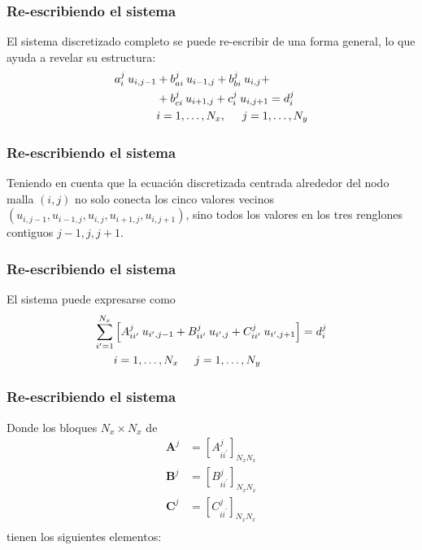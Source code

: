 \begin{frame}
\frametitle{Re-escribiendo el sistema}
El sistema discretizado completo se puede re-escribir de una forma general, lo que ayuda a revelar su estructura:
\begin{equation}
\begin{aligned}
a_{i}^{j} \: u_{i, j-1} &+ b_{ai}^{j} \: u_{i-1, j} + b_{bi}^{j} \: u_{i, j} + \\
&+ b_{ci}^{j} \: u_{i+1, j} + c_{i}^{j} \: u_{i, j+1} = d_{i}^{j} \\
&i = 1, \ldots, N_{x}, \hspace{0.5cm} j = 1, \ldots, N_{y}
\end{aligned}
\label{eq:ecuacion_13_14}
\end{equation}
\end{frame}
\begin{frame}
\frametitle{Re-escribiendo el sistema}
Teniendo en cuenta que la ecuación discretizada centrada alrededor del nodo malla $(i, j)$ no solo conecta los cinco valores vecinos $(u_{i, j-1}, u_{i-1, j}, u_{i,j}, u_{i+1, j}, u_{i, j+1})$, sino todos los valores en los tres renglones contiguos $j-1, j, j+1$.
\end{frame}
\begin{frame}
\frametitle{Re-escribiendo el sistema}
 El sistema puede expresarse como
\begin{equation}
\begin{aligned}
\sum_{i^{\prime} = 1}^{N_{x}} &\left[ A_{ii^{\prime}}^{j} \: u_{i^{\prime}, j-1} + B_{ii^{\prime}}^{j} \: u_{i^{\prime}, j} + C_{ii^{\prime}}^{j} \: u_{i^{\prime}, j+1}  \right] = d_{i}^{j} \\
&i = 1, \ldots, N_{x} \hspace{0.5cm} j = 1, \ldots, N_{y}
\end{aligned}
\label{eq:ecuacion_13_15}
\end{equation}
\end{frame}
\begin{frame}
\frametitle{Re-escribiendo el sistema}
Donde los bloques $N_{x} \times N_{x}$ de
\begin{align*}
\mathbf{A}^{j} &= [A_{ii^{\prime}}^{j}]_{N_{x} N_{x}} \\
\mathbf{B}^{j} &= [B_{ii^{\prime}}^{j}]_{N_{x} N_{x}} \\
\mathbf{C}^{j} &= [C_{ii^{\prime}}^{j}]_{N_{x} N_{x}} \\
\end{align*}   
tienen los siguientes elementos:
\end{frame}

